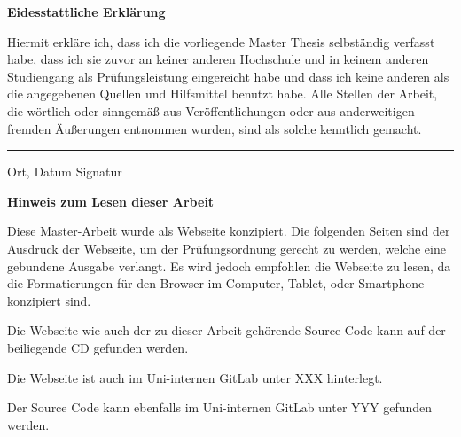\documentclass[12pt, twoside]{report}
\begin{document}

{\huge \textbf{Eidesstattliche Erklärung}} \bigskip

Hiermit  erkläre  ich,  dass  ich  die  vorliegende 
Master Thesis selbständig  verfasst  habe,  dass  ich  sie  zuvor  an  keiner  anderen  Hochschule  und  in  
keinem  anderen  Studiengang  als  Prüfungsleistung  eingereicht  habe  und  dass  ich keine  anderen  als  die  angegebenen  Quellen  und  Hilfsmittel  benutzt  habe.  Alle Stellen  der  Arbeit,  die  wörtlich  oder  sinngemäß  aus  Veröffentlichungen  oder  aus anderweitigen  fremden  Äußerungen  entnommen  wurden,  sind  als  solche  kenntlich gemacht.   
\newline
\newline
\newline
\rule{\textwidth}{1pt}
Ort, Datum \hfill Signatur


\newpage
{\huge \textbf{Hinweis zum Lesen dieser Arbeit}} \bigskip

Diese Master-Arbeit wurde als Webseite konzipiert. Die folgenden Seiten sind der Ausdruck der Webseite, um der Prüfungsordnung gerecht zu werden, welche eine gebundene Ausgabe verlangt. Es wird jedoch empfohlen die Webseite zu lesen, da die Formatierungen für den Browser im Computer, Tablet, oder Smartphone konzipiert sind.

Die Webseite wie auch der zu dieser Arbeit gehörende Source Code kann auf der beiliegende CD gefunden werden.

Die Webseite ist auch im Uni-internen GitLab unter XXX hinterlegt.

Der Source Code kann ebenfalls im Uni-internen GitLab unter YYY gefunden werden. 
\end{document}
